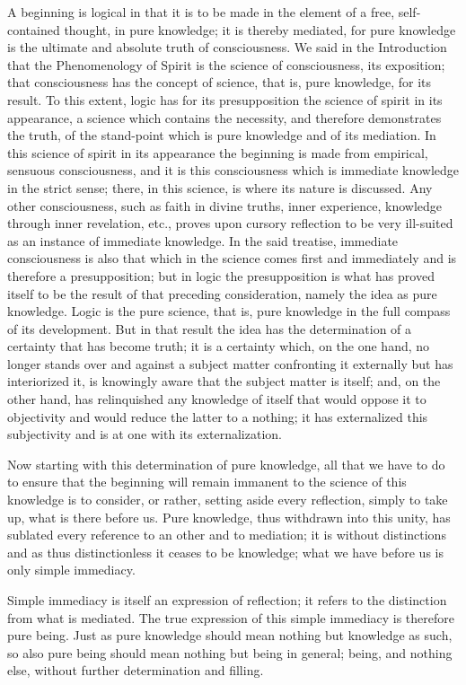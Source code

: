 A beginning is logical in that it is to be made in
the element of a free, self-contained thought, in pure knowledge;
it is thereby mediated, for pure knowledge is
the ultimate and absolute truth of consciousness.
We said in the Introduction that the Phenomenology of Spirit is
the science of consciousness, its exposition;
that consciousness has the concept of science,
that is, pure knowledge, for its result.
To this extent, logic has for its presupposition
the science of spirit in its appearance,
a science which contains the necessity,
and therefore demonstrates the truth,
of the stand-point which is pure knowledge
and of its mediation.
In this science of spirit in its appearance
the beginning is made from empirical, sensuous consciousness,
and it is this consciousness which is immediate knowledge in the strict sense;
there, in this science, is where its nature is discussed.
Any other consciousness, such as faith in divine truths, inner experience,
knowledge through inner revelation, etc., proves upon cursory reflection
to be very ill-suited as an instance of immediate knowledge.
In the said treatise, immediate consciousness is also
that which in the science comes first and immediately
and is therefore a presupposition;
but in logic the presupposition is what has proved itself to be
the result of that preceding consideration,
namely the idea as pure knowledge.
Logic is the pure science, that is,
pure knowledge in the full compass of its development.
But in that result the idea has the determination of
a certainty that has become truth;
it is a certainty which, on the one hand, no longer stands
over and against a subject matter confronting it externally
but has interiorized it, is knowingly aware
that the subject matter is itself;
and, on the other hand, has relinquished
any knowledge of itself that would oppose it to objectivity
and would reduce the latter to a nothing;
it has externalized this subjectivity
and is at one with its externalization.

Now starting with this determination of pure knowledge,
all that we have to do to ensure that the beginning will remain
immanent to the science of this knowledge is to consider,
or rather, setting aside every reflection, simply to take up,
what is there before us.
Pure knowledge, thus withdrawn into this unity,
has sublated every reference to an other and to mediation;
it is without distinctions and as thus distinctionless
it ceases to be knowledge;
what we have before us is only simple immediacy.

Simple immediacy is itself an expression of reflection;
it refers to the distinction from what is mediated.
The true expression of this simple immediacy is therefore pure being.
Just as pure knowledge should mean nothing but knowledge as such,
so also pure being should mean nothing but being in general;
being, and nothing else, without further determination and filling.

